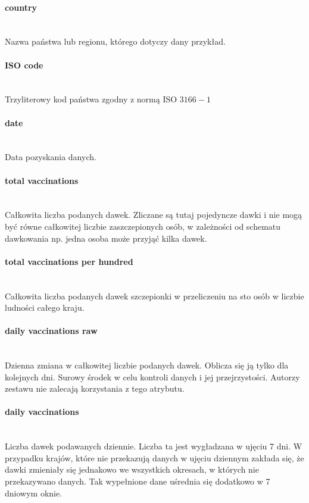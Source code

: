 \documentclass[12pt, oneside, openany]{article}
\begin{document}
\paragraph{country}
\mbox{}\\
Nazwa państwa lub regionu, którego dotyczy dany przykład.

\paragraph{ISO code}
\mbox{}\\
Trzyliterowy kod państwa zgodny z normą ISO $3166-1$

\paragraph{date}
\mbox{}\\
Data pozyskania danych. 

\paragraph{total vaccinations}
\mbox{}\\
Całkowita liczba podanych dawek. Zliczane są tutaj pojedyncze dawki i nie mogą być równe całkowitej liczbie zaszczepionych osób, w zależności od schematu dawkowania np. jedna osoba może przyjąć kilka dawek.

\paragraph{total vaccinations per hundred}
\mbox{}\\
Całkowita liczba podanych dawek szczepionki w przeliczeniu na sto osób w liczbie ludności całego kraju.

\paragraph{daily vaccinations raw}
\mbox{}\\
Dzienna zmiana w całkowitej liczbie podanych dawek. Oblicza się ją tylko dla kolejnych dni. Surowy środek w celu kontroli danych i jej przejrzystości. Autorzy zestawu nie zalecają korzystania z tego atrybutu. 

\paragraph{daily vaccinations}
\mbox{}\\
Liczba dawek podawanych dziennie. Liczba ta jest wygładzana w ujęciu 7 dni. W przypadku krajów, które nie przekazują danych w ujęciu dziennym zakłada się, że dawki zmieniały się jednakowo we wszystkich okresach, w których nie przekazywano danych. Tak wypełnione dane uśrednia się dodatkowo w 7 dniowym oknie.
\end{document}
